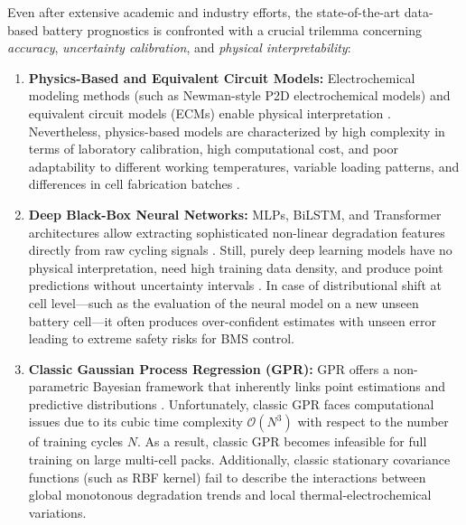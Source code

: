 \documentclass[a4paper,fleqn]{cas-sc}
\begin{document}
Even after extensive academic and industry efforts, the state-of-the-art data-based battery prognostics is confronted with a crucial trilemma concerning \textit{accuracy}, \textit{uncertainty calibration}, and \textit{physical interpretability}:
\begin{enumerate}
    \item \textbf{Physics-Based and Equivalent Circuit Models:} Electrochemical modeling methods (such as Newman-style P2D electrochemical models) and equivalent circuit models (ECMs) enable physical interpretation \cite{martinez2026sensor, lee2026smartphone}. Nevertheless, physics-based models are characterized by high complexity in terms of laboratory calibration, high computational cost, and poor adaptability to different working temperatures, variable loading patterns, and differences in cell fabrication batches \cite{gupta2026fusion, oconnor2026separating}.
    \item \textbf{Deep Black-Box Neural Networks:} MLPs, BiLSTM, and Transformer architectures allow extracting sophisticated non-linear degradation features directly from raw cycling signals \cite{chen2024lstm, zhou2023bilstm, zhao2024stacked, wu2024endcloud, liu2026dualbranch, kim2026uncertainty}. Still, purely deep learning models have no physical interpretation, need high training data density, and produce point predictions without uncertainty intervals \cite{park2025feature, sun2024interpretable}. In case of distributional shift at cell level—such as the evaluation of the neural model on a new unseen battery cell—it often produces over-confident estimates with unseen error leading to extreme safety risks for BMS control.
    \item \textbf{Classic Gaussian Process Regression (GPR):} GPR offers a non-parametric Bayesian framework that inherently links point estimations and predictive distributions \cite{liu2018novel, richardson2019multiscale, yang2018multiscale, li2024lowdim, wang2024bayesian, alvarez2026uncertainty}. Unfortunately, classic GPR faces computational issues due to its cubic time complexity $\mathcal{O}(N^3)$ with respect to the number of training cycles $N$. As a result, classic GPR becomes infeasible for full training on large multi-cell packs. Additionally, classic stationary covariance functions (such as RBF kernel) fail to describe the interactions between global monotonous degradation trends and local thermal-electrochemical variations.
\end{enumerate}
\end{document}
